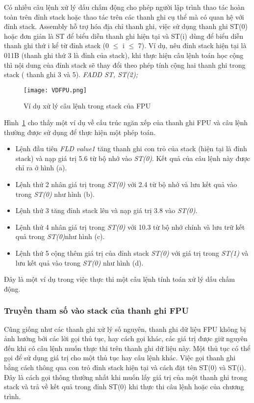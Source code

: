 			Có nhiều câu lệnh xử lý dấu chấm động cho phép người lập trình thao tác hoàn toàn trên đỉnh stack hoặc thao tác trên các thanh ghi cụ thể mà có quan hệ với đỉnh stack. Assembly hỗ trợ hóa địa chỉ thanh ghi, việc sử dụng thanh ghi ST(0) hoặc đơn giản là ST để biểu diễn thanh ghi hiện tại và ST(i) dùng để biểu diễn thanh ghi thứ i kể từ đỉnh stack (0 $\mathbb{\le}$ i  $\mathbb{\le}$ 7). Ví dụ, nêu đỉnh stack hiện tại là 011B (thanh ghi thứ 3 là đỉnh của stack), khi thực hiện câu lệnh toán học cộng thì nội dung của đỉnh stack sẽ thay đổi theo phép tính cộng hai thanh ghi trong stack ( thanh ghi 3 và 5). \textit{	FADD ST, ST(2);} 	
	\begin{center}
			\begin{figure}[htp]
				\begin{center}
					\texttt{[image: VDFPU.png]}
				\end{center}
				\caption{Ví dụ xử lý câu lệnh trong stack của FPU}				
				\label{fig:VDFPU}				
			\end{figure}
		\end{center}		
	
	Hình~\ref{fig:VDFPU} cho thấy một ví dụ về cấu trúc ngăn xếp của thanh ghi FPU và câu lệnh thường được sử dụng để thực hiện một phép toán. 
	\begin{itemize}
		\item[1]	Lệnh đầu tiên \textit{FLD value1} tăng thanh ghi con trỏ của stack (hiện tại là đỉnh stack) và nạp giá trị 5.6 từ bộ nhớ vào \textit{ST(0)}. Kết quả của câu lệnh này được chỉ ra ở hình (a).
		\item[2]	Lệnh thứ 2 nhân giá trị trong \textit{ST(0)} với 2.4 từ bộ nhớ và lưu kết quả vào trong \textit{ST(0)} như hình (b).
		\item[3] Lệnh thứ 3 tăng đỉnh stack lên và nạp giá trị 3.8 vào \textit{ST(0)}.
		\item[4]	Lệnh thứ 4 nhân giá trị trong \textit{ST(0)} với 10.3 từ bộ nhớ chính và lưu trữ kết quả trong \textit{ST(0)}như hình (c).
		\item[5]	Lệnh thứ 5 cộng thêm giá trị của đỉnh stack \textit{ST(0)} với giá trị trong \textit{ST(1)} và lưu kết quả vào trong \textit{ST(0)} như hình (d).
	\end{itemize}
	
		Đây là một ví dụ trong việc thực thi một câu lệnh tính toán xử lý dấu chấm động.
	
	\newpage
	\subsubsection*{Truyền tham số vào stack của thanh ghi FPU}	
	Cũng giống như các thanh ghi xử lý số nguyên, thanh ghi dữ liệu FPU không bị ảnh hưởng bởi các lời gọi thủ tục, hay cách gọi khác, các giá trị được giữ nguyên đến khi có câu lệnh muốn thực thi trên thanh ghi dữ liệu này. Một thủ tục có thể gọi để sử dụng giá trị cho một thủ tục hay câu lệnh khác. Việc gọi thanh ghi bằng cách thông qua con trỏ đỉnh stack hiện tại và cách đặt tên ST(0) và ST(i). Đây là cách gọi thông thường nhất khi muốn lấy giá trị của một thanh ghi trong stack và trả về kết quả trong đỉnh ST(0) khi thực thi câu lệnh hoặc của chương trình.	
		
